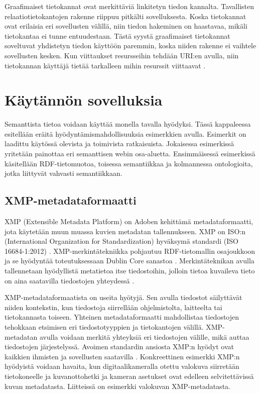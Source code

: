 \documentclass[finnish, 12pt, a4paper, elec, utf8, pdfa, online]{aaltothesis}
\begin{document}
{Graafimaiset tietokannat ovat merkittäviä linkitetyn tiedon kannalta. Tavallisten relaatiotietokantojen rakenne riippuu pitkälti sovelluksesta. Koska tietokannat ovat erilaisia eri sovellusten välillä, niin tiedon hakeminen on haastavaa, mikäli tietokantaa ei tunne entuudestaan. Tästä syystä graafimaiset tietokannat soveltuvat yhdistetyn tiedon käyttöön paremmin, koska niiden rakenne ei vaihtele sovellusten kesken. Kun viittaukset resursseihin tehdään URI:en avulla, niin tietokannan käyttäjä tietää tarkalleen mihin resurssit viittaavat \cite{cambridge_linked}.
\clearpage

\section{Käytännön sovelluksia}
Semanttista tietoa voidaan käyttää monella tavalla hyödyksi. Tässä kappaleessa esitellään eräitä hyödyntämismahdollisuuksia esimerkkien avulla. Esimerkit on laadittu käytössä olevista ja toimivista ratkaisuista. Jokaisessa esimerkissä yritetään painottaa eri semanttisen webin osa-aluetta. Ensimmäisessä esimerkissä käsitellään RDF-tietomuotoa, toisessa semantiikkaa ja kolmannessa ontologioita, jotka liittyvät vahvasti semantiikkaan.


\subsection{XMP-metadataformaatti}
XMP (Extensible Metadata Platform) on Adoben kehittämä metadataformaatti, jota käytetään muun muassa kuvien metadatan tallennukseen. XMP on ISO:n (International Organization for Standardization) hyväksymä standardi (ISO 16684-1:2012) \cite{XMP_standard}. XMP-merkintätekniikka pohjautuu RDF-tietomallin osajoukkoon ja se hyödyntää toteutuksessaan Dublin Core sanastoa \cite{XMP2}. Merkintäteknikan avulla tallennetaan hyödyllistä metatietoa itse tiedostoihin, jolloin tietoa kuvaileva tieto on aina saatavilla tiedostojen yhteydessä \cite{XMP1}.

XMP-metadataformaatista on useita hyötyjä. Sen avulla tiedostot säilyttävät niiden kontekstin, kun tiedostoja siirrellään ohjelmistolta, laitteelta tai tietokannasta toiseen. Yhteinen metadataformaatti mahdollistaa tiedostojen tehokkaan etsimisen eri tiedostotyyppien ja tietokantojen välillä. XMP-metadatan avulla voidaan merkitä yhteyksiä eri tiedostojen välille, mikä auttaa tiedostojen järjestelyssä. Avoimen standardin ansiosta XMP:n hyödyt ovat kaikkien ihmisten ja sovellusten saatavilla \cite{XMP_overall}. Konkreettinen esimerkki XMP:n hyödyistä voidaan havaita, kun digitaalikameralla otettu valokuva siirretään tietokoneelle ja kuvanottohetki ja kameran asetukset ovat edelleen selvitettävissä kuvan metadatasta. Liitteissä on esimerkki valokuvan XMP-metadatasta.

}
\end{document}
